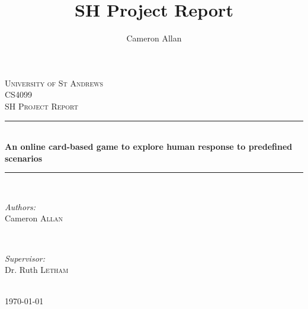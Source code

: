 \documentclass{IEEEtran}
\begin{document}
\title{SH Project Report}
\author{Cameron Allan}

\begin{titlepage}

\newcommand{\HRule}{\rule{\linewidth}{0.5mm}}
\renewcommand{\contentsname}{Table of Contents}

\center
 

\textsc{\LARGE University of St Andrews}\\[1.5cm]
\textsc{\Large CS4099}\\[0.5cm]
\textsc{\large SH Project Report}\\[0.5cm]


\HRule \\[0.4cm]
{ \huge \bfseries An online card-based game to explore human response to predefined scenarios}\\[0.4cm] %
\HRule \\[1.5cm]
 

\begin{minipage}{0.4\textwidth}
\begin{flushleft} \large
\emph{Authors:}\\
Cameron \textsc{Allan}
\end{flushleft}
\end{minipage}
~
\begin{minipage}{0.4\textwidth}
\begin{flushright} \large
\emph{Supervisor:} \\
Dr. Ruth \textsc{Letham}
\end{flushright}
\end{minipage}\\[0.5cm]

{\large \today}\\[0.5cm]


\end{titlepage}
\end{document}
